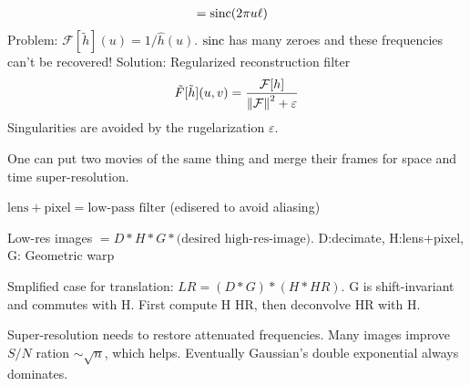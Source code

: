 \begin{compactdesc}
\begin{align*}
			&=\operatorname{sinc}\!\left(2\pi u\ell  \right)
		\end{align*}
		Problem: $\mathcal{F}[\tilde{h}](u)=1/\hat{h}(u)$. $\operatorname{sinc}$ has many zeroes and these frequencies can't be recovered! Solution: Regularized reconstruction filter
		\begin{gather*}
			\tilde{F}[\tilde{h}](u,v)=\frac{\mathcal{F}[h]}{\left\lVert \mathcal{F} \right\rVert^2+\varepsilon}
		\end{gather*}
		Singularities are avoided by the rugelarization $\varepsilon$.
	\item[\lp{Space-time super-resolution}] One can put two movies of the same thing and merge their frames for space and time super-resolution.
	\item[\lp{Spatial super-resolution}] 
		\begin{inparaitem}
			\item $\text{lens}+\text{pixel}=\text{low-pass filter}$ (edisered to avoid aliasing)
			\item Low-res images $=D*H*G*\text{(desired high-res-image)}$. D:decimate, H:lens+pixel, G: Geometric warp
			\item Smplified case for translation: $LR=(D*G)*(H*HR)$. G is shift-invariant and commutes with H. First compute H HR, then deconvolve HR with H.
			\item Super-resolution needs to restore attenuated frequencies. Many images improve $S/N$ ration $\sim\sqrt{n}$, which helps. Eventually Gaussian's double exponential always dominates.
		\end{inparaitem}
\end{compactdesc}
